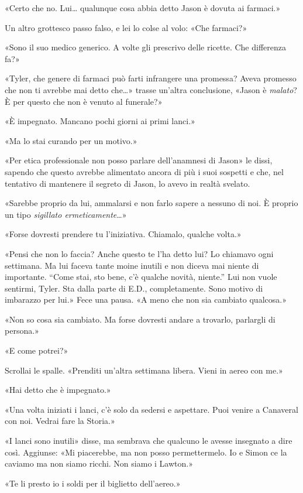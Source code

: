 «Certo che no. Lui\ldots{} qualunque cosa abbia detto Jason è dovuta ai
farmaci.»

Un altro grottesco passo falso, e lei lo colse al volo: «Che farmaci?»

«Sono il suo medico generico. A volte gli prescrivo delle ricette. Che
differenza fa?»

«Tyler, che genere di farmaci può farti infrangere una promessa? Aveva
promesso che non ti avrebbe mai detto che\ldots» trasse un'altra
conclusione, «Jason è \emph{malato}? È per questo che non è venuto al
funerale?»

«È impegnato. Mancano pochi giorni ai primi lanci.»

«Ma lo stai curando per un motivo.»

«Per etica professionale non posso parlare dell'anamnesi di Jason» le
dissi, sapendo che questo avrebbe alimentato ancora di più i suoi
sospetti e che, nel tentativo di mantenere il segreto di Jason, lo avevo
in realtà svelato.

«Sarebbe proprio da lui, ammalarsi e non farlo sapere a nessuno di noi.
È proprio un tipo \emph{sigillato ermeticamente}\ldots»

«Forse dovresti prendere tu l'iniziativa. Chiamalo, qualche volta.»

«Pensi che non lo faccia? Anche questo te l'ha detto lui? Lo chiamavo
ogni settimana. Ma lui faceva tante moine inutili e non diceva mai
niente di importante. ``Come stai, sto bene, c'è qualche novità,
niente.'' Lui non vuole sentirmi, Tyler. Sta dalla parte di E.D.,
completamente. Sono motivo di imbarazzo per lui.» Fece una pausa. «A
meno che non sia cambiato qualcosa.»

«Non so cosa sia cambiato. Ma forse dovresti andare a trovarlo,
parlargli di persona.»

«E come potrei?»

Scrollai le spalle. «Prenditi un'altra settimana libera. Vieni in aereo
con me.»

«Hai detto che è impegnato.»

«Una volta iniziati i lanci, c'è solo da sedersi e aspettare. Puoi
venire a Canaveral con noi. Vedrai fare la Storia.»

«I lanci sono inutili» disse, ma sembrava che qualcuno le avesse
insegnato a dire così. Aggiunse: «Mi piacerebbe, ma non posso
permettermelo. Io e Simon ce la caviamo ma non siamo ricchi. Non siamo i
Lawton.»

«Te li presto io i soldi per il biglietto dell'aereo.»

